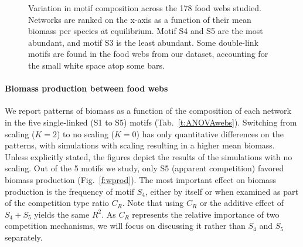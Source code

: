 \documentclass[12pt]{article}
\begin{document}
\begin{figure}[tbp]
   \centering
   \caption{Variation in motif composition across the 178 food webs studied. Networks are ranked on the x-axis as a function of their mean biomass per species at equilibrium. Motif S4 and S5 are the most abundant, and motif S3 is the least abundant. Some double-link motifs are found in the food webs from our dataset, accounting for the small white space atop some bars.}
   \label{f:motifs}
\end{figure}

\paragraph{Biomass production between food webs}

We report patterns of biomass as a function of the composition of each network in the five single-linked (S1 to S5) motifs (Tab.~\ref{t:ANOVAwebs}). Switching from scaling ($K = 2$) to no scaling ($K = 0$) has only quantitative differences on the patterns, with simulations with scaling resulting in a higher mean biomass. Unless explicitly stated, the figures depict the results of the simulations with no scaling. Out of the 5 motifs we study, only S5 (apparent competition) favored biomass production (Fig.~\ref{f:wprod}). The most important effect on biomass production is the frequency of motif $S_{4}$, either by itself or when examined as part of the competition type ratio $C_{R}$. Note that using $C_{R}$ or the additive effect of $S_{4}+S_{5}$ yields the same $R^{2}$. As $C_{R}$ represents the relative importance of two competition mechanisms, we will focus on discussing it rather than $S_{4}$ and $S_{5}$ separately.
\end{document}
